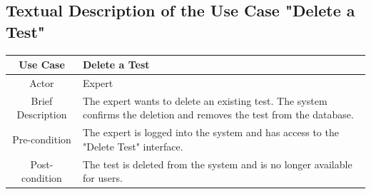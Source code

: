 \subsection{Textual Description of the Use Case "Delete a Test"}
\begin{table}[h]
    \centering
        \begin{tabular}{|c|p{12cm}|}
            \hline
            Use Case & Delete a Test \\
            \hline
            Actor & Expert  \\
            \hline
            Brief Description & The expert wants to delete an existing test. The system confirms the deletion and removes the test from the database. \\
            \hline
            Pre-condition & The expert is logged into the system and has access to the "Delete Test" interface. \\
            \hline
            Post-condition & The test is deleted from the system and is no longer available for users. \\
     

\end{tabular}
\end{table}

